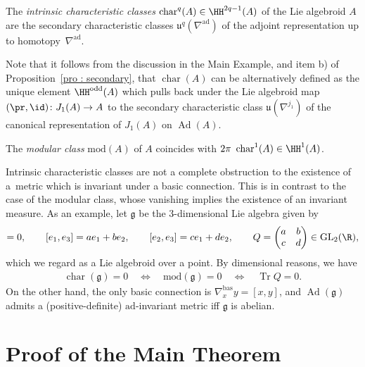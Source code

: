 \begin{defi} The {\it intrinsic characteristic classes} $\operatorname{char}^q(A) \in \HH^{2q-1}(A)$ of the Lie algebroid $A$ are the secondary characteristic classes $\mathfrak{u}^q(\nabla^{\mathrm{ad}})$ of the adjoint representation up to homotopy~$\nabla^{\mathrm{ad}}$.
\end{defi}
Note that it follows from the discussion in the Main Example, and item b) of Proposition~\ref{pro : secondary}, that $\operatorname{char}(A)$ can be alternatively defined as the unique element $\HH^{\mathrm{odd}}(A)$ which pulls back under the Lie algebroid map $(\pr,\id)\colon J_1(A) \to A$ to the secondary characteristic class $\mathfrak{u}(\nabla^{j_1})$ of the canonical representation of $J_1(A)$ on $\operatorname{Ad}(A)$.

\begin{example*}The \emph{modular class} $\mathrm{mod}(A)$ of $A$ coincides with $2\pi\ \operatorname{char}^1(A) \in \HH^{1}(A)$.
\end{example*}

\begin{remark*} Intrinsic characteristic classes are not a complete obstruction to the existence of a~metric which is invariant under a basic connection. This is in contrast to the case of the modular class, whose vanishing implies the existence of an invariant measure. As an example, let $\mathfrak{g}$ be the 3-dimensional Lie algebra given by
 \begin{gather*}
 [e_1,e_2] = 0, \qquad [e_1,e_3] = ae_1+be_2, \qquad [e_2,e_3] = ce_1+de_2, \qquad Q = \left( \begin{matrix}
 a & b\\
 c & d
 \end{matrix}
 \right) \in \mathrm{GL}_2(\R),
 \end{gather*}which we regard as a Lie algebroid over a point. By dimensional reasons, we have
 \begin{gather*}
 \operatorname{char}(\mathfrak{g}) = 0 \quad \Longleftrightarrow \quad \mathrm{mod}(\mathfrak{g})=0 \quad \Longleftrightarrow \quad \operatorname{Tr} Q=0.
 \end{gather*}On the other hand, the only basic connection is $\nabla^{\mathrm{bas}}_xy = [x,y]$, and $\operatorname{Ad}(\mathfrak{g})$ admits a (positive-definite) $\mathrm{ad}$-invariant metric iff $\mathfrak{g}$ is abelian.
\end{remark*}

\section{Proof of the Main Theorem}\label{section3}

